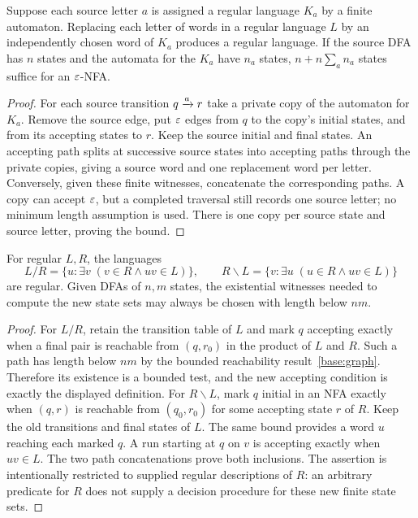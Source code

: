 \begin{theorem}\label{reg:substitution}
Suppose each source letter $a$ is assigned a regular language $K_a$ by a
finite automaton.  Replacing each letter of words in a regular language
$L$ by an independently chosen word of $K_a$ produces a regular language.
If the source DFA has $n$ states and the automata for the $K_a$ have
$n_a$ states, $n+n\sum_a n_a$ states suffice for an $\varepsilon$-NFA.
\end{theorem}
\begin{proof}
For each source transition $q\mathrel{\smash{\xrightarrow{a}}}r$ take a
private copy of the automaton for $K_a$.  Remove the source edge, put
$\varepsilon$ edges from $q$ to the copy's initial states, and from its accepting
states to $r$.  Keep the source initial and final states.  An accepting
path splits at successive source states into accepting paths through the
private copies, giving a source word and one replacement word per letter.
Conversely, given these finite witnesses, concatenate the corresponding
paths.  A copy can accept $\varepsilon$, but a completed traversal still records
one source letter; no minimum length assumption is used.  There is one
copy per source state and source letter, proving the bound.
\end{proof}

\begin{theorem}\label{reg:quotient}
For regular $L,R$, the languages
\[
 L/R=\{u:\exists v\;(v\in R\wedge uv\in L)\},\qquad
 R\backslash L=\{v:\exists u\;(u\in R\wedge uv\in L)\}
\]
are regular.  Given DFAs of $n,m$ states, the existential witnesses needed
to compute the new state sets may always be chosen with length below $nm$.
\end{theorem}
\begin{proof}
For $L/R$, retain the transition table of $L$ and mark $q$ accepting
exactly when a final pair is reachable from $(q,r_0)$ in the product of
$L$ and $R$.  Such a path has length below $nm$ by
the bounded reachability result~\ref{base:graph}.  Therefore its existence is a bounded test, and the
new accepting condition is exactly the displayed definition.
For $R\backslash L$, mark $q$ initial in an NFA exactly when
$(q,r)$ is reachable from $(q_0,r_0)$ for some accepting state $r$ of $R$.
Keep the old transitions and final states of $L$.  The same bound provides
a word $u$ reaching each marked $q$.  A run starting at $q$ on $v$ is
accepting exactly when $uv\in L$.  The two path concatenations prove both
inclusions.  The assertion is intentionally restricted to supplied
regular descriptions of $R$: an arbitrary predicate for $R$ does not
supply a decision procedure for these new finite state sets.
\end{proof}

